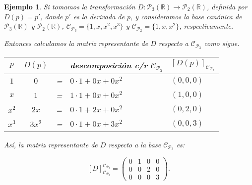 \documentclass[12pt]{book}
\newtheorem{ejem}{Ejemplo}
\def\R{\mathbb{R}}
\def\P{\mathcal{P}}
\def\Ccal{\mathcal{C}}
\begin{document}
\begin{ejem}
Si tomamos la transformación $D:\P_3(\R)\rightarrow\P_2(\R)$, definida por $D(p)=p'$, donde $p'$ es la \emph{derivada} de $p$, y consideramos la base canónica de $\P_3(\R)$ y $\P_2(\R)$, $\Ccal_{\P_3}=\{1,x,x^2,x^3\}$ y $\Ccal_{\P_2}=\{1,x,x^2\}$, respectivamente.

{\em Entonces calculamos la matriz representante de $D$ respecto a $\Ccal_{\P_3}$ como sigue.

\begin{tabular}{c|ccl|l}
$p$&$D(p)$&&descomposición c/r $\Ccal_{\P_2}$&$[D(p)]_{\Ccal_{\P_2}}$\\\hline
$1$ & $0$ &=&$0\cdot1+0x+0x^2$& $(0,0,0)$\\
$x$& $1$&=&$1\cdot1+0x+0x^2$& $(1,0,0)$\\
$x^2$&$2x$&=&$0\cdot1+2x+0x^2$& $(0,2,0)$\\
$x^3$&$3x^2$&=&$0\cdot1+0x+3x^2$& $(0,0,3)$\\
\end{tabular}

Así, la matriz representante de $D$ respecto a la base $\Ccal_{\P_3}$ es:

$$[D]_{\Ccal_{\P_3}}^{\Ccal_{\P_2}}=
\left(\begin{array}{cccc}
0&1&0&0\\
0&0&2&0\\
0&0&0&3
\end{array}\right).$$
}
\end{ejem}
\end{document}
